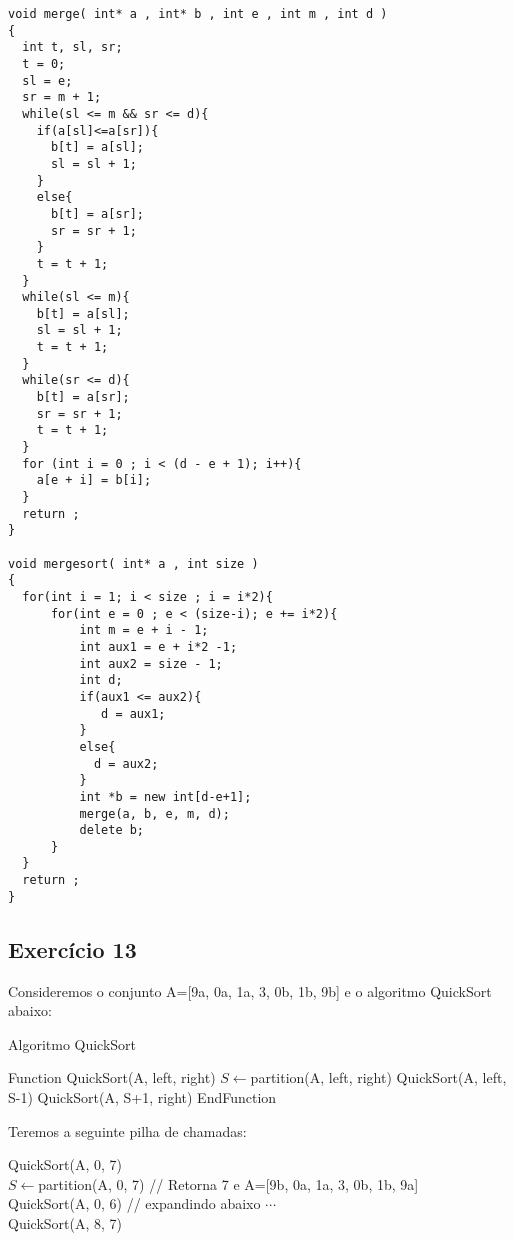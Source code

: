\begin{lstlisting}
void merge( int* a , int* b , int e , int m , int d )
{
  int t, sl, sr;
  t = 0;
  sl = e;
  sr = m + 1;
  while(sl <= m && sr <= d){
    if(a[sl]<=a[sr]){
      b[t] = a[sl];
      sl = sl + 1;
    }
    else{
      b[t] = a[sr];
      sr = sr + 1;
    }
    t = t + 1;
  }
  while(sl <= m){
    b[t] = a[sl];
    sl = sl + 1;
    t = t + 1;
  }
  while(sr <= d){
    b[t] = a[sr];
    sr = sr + 1;
    t = t + 1;
  }
  for (int i = 0 ; i < (d - e + 1); i++){
    a[e + i] = b[i];
  }
  return ;
}

void mergesort( int* a , int size )
{  
  for(int i = 1; i < size ; i = i*2){
      for(int e = 0 ; e < (size-i); e += i*2){
          int m = e + i - 1;
          int aux1 = e + i*2 -1;
          int aux2 = size - 1;
          int d;
          if(aux1 <= aux2){
             d = aux1;
          }
          else{
            d = aux2;
          }
          int *b = new int[d-e+1];
          merge(a, b, e, m, d);
          delete b;
      } 
  }
  return ;
}
\end{lstlisting}

\subsection{Exercício 13}\label{sec:exer13}

Consideremos o conjunto A=[9a, 0a, 1a, 3, 0b, 1b, 9b] e o algoritmo QuickSort
abaixo:

\begin{algorithm}
  \caption{Algoritmo QuickSort}
  \begin{algorithmic}
    \STATE Function QuickSort(A, left, right)
      \STATE $S \leftarrow $partition(A, left, right)
      \STATE QuickSort(A, left, S-1)
      \STATE QuickSort(A, S+1, right)
    \STATE EndFunction
  \end{algorithmic}
\end{algorithm}

Teremos a seguinte pilha de chamadas: \\
\begin{tabbing}
QuickSort(A, 0, 7) \\
  \hspace{1em}$S \leftarrow $partition(A, 0, 7) // Retorna 7 e A=[9b, 0a, 1a, 3, 0b, 1b, 9a] \\
  \hspace{1em}QuickSort(A, 0, 6) // expandindo abaixo $\cdots $\\
  \hspace{1em}QuickSort(A, 8, 7)
\end{tabbing}


